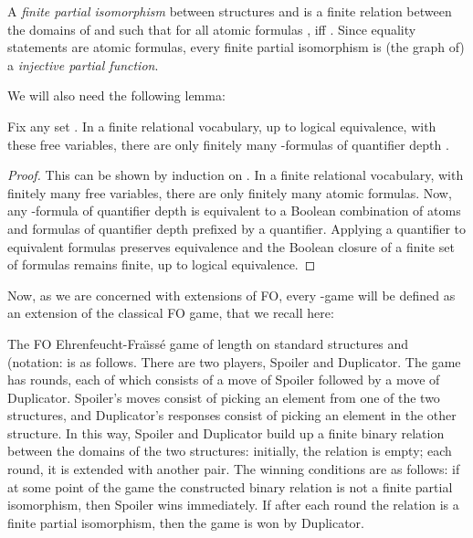 \documentclass{LMCS}
\newcommand{\fo}{\textsf{FO}\xspace}
\begin{document}
\begin{defi}
A \emph{finite partial isomorphism} between structures  and
 is a finite relation 
between the domains of  and  such that for all atomic
formulas ,  iff . Since
equality statements are atomic formulas, every finite partial
isomorphism is (the graph of) a \emph{injective partial function}.
\end{defi}

We will also need the following lemma:

\begin{lem}
Fix any set . In a finite
relational vocabulary, up to logical equivalence, with these free
variables, there are only finitely many -formulas of quantifier depth .
\label{finitenesslemma}
\end{lem}

\begin{proof}
This can be shown by induction on . In a finite relational vocabulary, with finitely many free variables, there are only finitely many atomic formulas. Now, any -formula of quantifier depth  is equivalent to a Boolean combination of atoms and formulas of quantifier depth  prefixed by a quantifier. Applying a quantifier to equivalent formulas preserves equivalence and the Boolean closure of a finite set of formulas remains finite, up to logical equivalence.
\end{proof}

Now, as we are concerned with extensions of \fo, every -game will be defined as an extension of the classical \fo game, that we recall here:

\begin{defi}[\fo Ehrenfeucht-Fra\"\i ss\'e Game]
The \fo Ehrenfeucht-Fra\"\i ss\'e game of length  on standard structures  and  (notation:  is as follows.
There are two players, Spoiler and Duplicator. The game has  rounds, each of which consists of a move of Spoiler followed by a move of
Duplicator. Spoiler's moves consist of picking an element from one of the two structures, and Duplicator's responses consist of picking an element
in the other structure. In this way, Spoiler and Duplicator build up a finite binary relation between the domains of the two structures: initially, the
relation is empty; each round, it is extended with another pair. The winning conditions are as follows: if at some point of the game the
constructed binary relation is not a finite partial isomorphism, then Spoiler wins immediately. If after each round the relation is a finite
partial isomorphism, then the game is won by Duplicator.
\end{defi}
\end{document}
